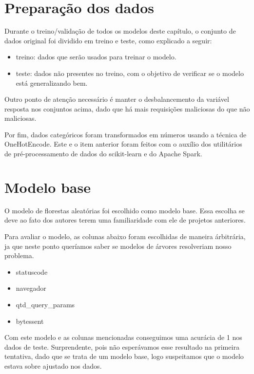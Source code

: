 \section{Preparação dos dados}

Durante o treino/validação de todos os modelos deste capítulo, o conjunto de dados original foi dividido 
em treino e teste, como explicado a seguir:

\begin{itemize}
    \item treino: dados que serão usados para treinar o modelo.
    \item teste: dados não presentes no treino, com o objetivo de verificar se o modelo está generalizando bem.
\end{itemize}

Outro ponto de atenção necessário é manter o desbalancemento da variável resposta nos 
conjuntos acima, dado que há mais requisições maliciosas do que não maliciosas. 

Por fim, dados categóricos foram transformados em números usando a técnica de OneHotEncode. Este e o item
anterior foram feitos com o auxílio dos utilitários de pré-processamento de dados do scikit-learn e do Apache Spark.

\section{Modelo base}

O modelo de florestas aleatórias foi escolhido como modelo base. Essa escolha se deve ao fato dos autores 
terem uma familiaridade com ele de projetos anteriores. 

Para avaliar o modelo, as colunas abaixo foram escolhidas de maneira árbitrária, ja que neste ponto 
queríamos saber se modelos de árvores resolveriam nosso problema.

\begin{itemize}
    \item statuscode
    \item navegador
    \item qtd\_query\_params
    \item bytessent
\end{itemize}


Com este modelo e as colunas mencionadas conseguimos uma acurácia de 1 nos dados de teste. Surprendente, pois 
não esperávamos esse resultado na primeira tentativa, dado que se trata de um modelo base, logo suspeitamos 
que o modelo estava sobre ajustado nos dados. 

